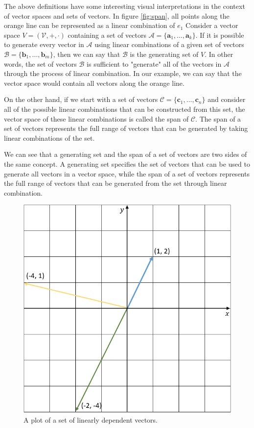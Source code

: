 \documentclass[12pt]{book}
\begin{document}
	The above definitions have some interesting visual interpretations in the context of vector spaces and sets of vectors. In figure \ref{fig:span}, all points along the orange line can be represented as a linear combination of $e_1$ Consider a vector space $\textit{V} = (\mathcal{V}, +, \cdot)$ containing a set of vectors $\mathcal{A} = \{\boldsymbol{a}_1,\ldots,\boldsymbol{a}_k\}$. If it is possible to generate every vector in $\mathcal{A}$ using linear combinations of a given set of vectors $\mathcal{B} = \{\boldsymbol{b}_1,\ldots,\boldsymbol{b}_m\}$, then we can say that $\mathcal{B}$ is the generating set of $\textit{V}$. In other words, the set of vectors $\mathcal{B}$ is sufficient to "generate" all of the vectors in $\mathcal{A}$ through the process of linear combination. In our example, we can say that the vector space would contain all vectors along the orange line.
	
	On the other hand, if we start with a set of vectors $\mathcal{C} = \{\boldsymbol{c}_1,\ldots,\boldsymbol{c}_n\}$ and consider all of the possible linear combinations that can be constructed from this set, the vector space of these linear combinations is called the span of $\mathcal{C}$. The span of a set of vectors represents the full range of vectors that can be generated by taking linear combinations of the set.
	
	We can see that a generating set and the span of a set of vectors are two sides of the same concept. A generating set specifies the set of vectors that can be used to generate all vectors in a vector space, while the span of a set of vectors represents the full range of vectors that can be generated from the set through linear combination.

	\begin{figure}[h]
		\centering
		\includegraphics[scale = 0.37]{linear_dependence.png}
		\caption{A plot of a set of linearly dependent vectors.}
		\label{fig:linear_dependent}
	\end{figure}
	
\end{document}
